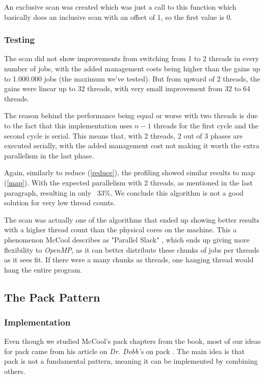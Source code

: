 \documentclass[10pt,journal]{IEEEtran}
\begin{document}
An exclusive scan was created which was just a call to this function which basically does an inclusive scan with an offset of 1, so the first value is 0.

\subsubsection{Testing}

The scan did not show improvements from switching from 1 to 2 threads in every number of jobs, with the added management costs being higher than the gains up to 1.000.000 jobs (the maximum we've tested). But from upward of 2 threads, the gains were linear up to 32 threads, with very small improvement from 32 to 64 threads. 

The reason behind the performance being equal or worse with two threads is due to the fact that this implementation uses $ n - 1 $ threads for the first cycle and the second cycle is serial. This means that, with 2 threads, 2 out of 3 phases are executed serially, with the added management cost not making it worth the extra parallelism in the last phase.

Again, similarly to reduce (\ref{reduce}), the profiling showed similar results to map (\ref{map}). With the expected parallelism with 2 threads, as mentioned in the last paragraph, resulting in only ~33\%. We conclude this algorithm is not a good solution for very low thread counts.

The scan was actually one of the algorithms that ended up showing better results with a higher thread count than the physical cores on the machine. This a phenomenon McCool describes as "Parallel Slack" \cite{mccool}, which ends up giving more flexibility to \textit{OpenMP}, as it can better distribute these chunks of jobs per threads as it sees fit. If there were a many chunks as threads, one hanging thread would hang the entire program.

\subsection{The Pack Pattern}
\subsubsection{Implementation}
\label{pack}

Even though we studied McCool's pack chapters from the book, most of our ideas for pack came from his article on \textit{Dr. Dobb's} on pack \cite{dobbpack}. The main idea is that pack is not a fundamental pattern, meaning it can be implemented by combining others. 
\end{document}
